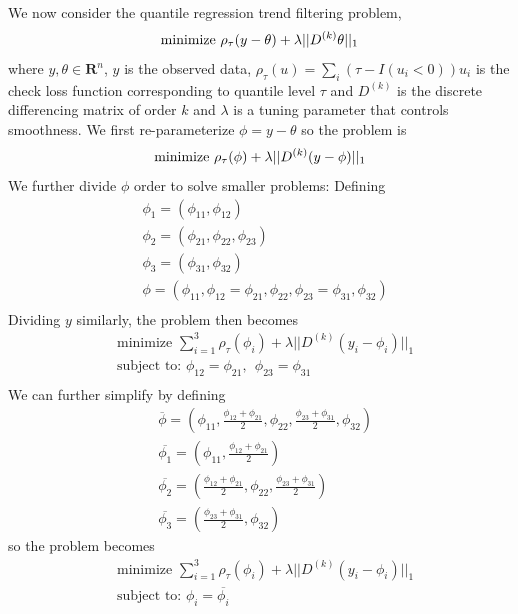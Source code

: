 \documentclass[12pt]{article}
\begin{document}
	We now consider the quantile regression trend filtering problem,  
	\begin{equation}
	\text{minimize } \rho_\tau(y-\theta) + \lambda||D^{(k)}\theta||_1\\
	\end{equation}
	where $y,\theta \in \mathbf{R}^n$, $y$ is the observed data, $\rho_{\tau}(u) = \sum_i(\tau - I(u_i < 0))u_i$ is the check loss function corresponding to quantile level $\tau$ and $D^{(k)}$ is the discrete differencing matrix of order $k$ and $\lambda$ is a tuning parameter that controls smoothness. We first re-parameterize $\phi = y-\theta$ so the problem is
	\begin{equation}
	\text{minimize } \rho_\tau(\phi) + \lambda||D^{(k)}(y-\phi)||_1\\
	\end{equation}
	We further divide $\phi$ order to solve smaller problems: Defining
	\begin{align}
	&\phi_1 = (\phi_{11}, \phi_{12})\\
	&\phi_2 = (\phi_{21}, \phi_{22}, \phi_{23})\\
	&\phi_3 = (\phi_{31}, \phi_{32})\\
	&\phi = (\phi_{11}, \phi_{12}=\phi_{21}, \phi_{22}, \phi_{23}=\phi_{31}, \phi_{32}) \\
	\end{align}
	Dividing $y$ similarly, the problem then becomes 
	\begin{align}
	&\text{minimize } \sum_{i=1}^3 \rho_\tau(\phi_i) + \lambda||D^{(k)}(y_i-\phi_i)||_1\\
	&\text{subject to: } \phi_{12}=\phi_{21}, ~~ \phi_{23}=\phi_{31}\\
	\end{align}
	We can further simplify by defining 
	\begin{align}
	&\overline{\phi} = (\phi_{11}, \frac{\phi_{12}+\phi_{21}}{2}, \phi_{22}, \frac{\phi_{23}+\phi_{31}}{2}, \phi_{32}) \\
	&\overline{\phi_1} = (\phi_{11}, \frac{\phi_{12}+\phi_{21}}{2})\\
	&\overline{\phi_2} = ( \frac{\phi_{12}+\phi_{21}}{2}, \phi_{22}, \frac{\phi_{23}+\phi_{31}}{2})\\
	&\overline{\phi_3} = (\frac{\phi_{23}+\phi_{31}}{2}, \phi_{32})
	\end{align}
	so the problem becomes
	\begin{align}
	&\text{minimize } \sum_{i=1}^3 \rho_\tau(\phi_i) + \lambda||D^{(k)}(y_i-\phi_i)||_1\\
	&\text{subject to: } \phi_{i}=\overline{\phi_i}\\
	\end{align}
\end{document}
